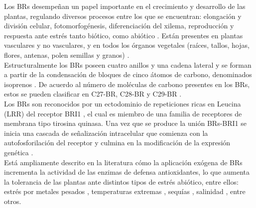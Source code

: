 Los BRs desempe\~nan un papel importante en el crecimiento y desarrollo de las plantas, regulando diversos procesos entre los que se encuentran: elongaci\'on y divisi\'on celular, fotomorfog\'enesis, diferenciaci\'on del xilema, reproducci\'on y respuesta ante estr\'es tanto bi\'otico, como abi\'otico \citep{nolan2020brassinosteroids}. Est\'an presentes en plantas vasculares y no vasculares, y en todos los \'organos vegetales (ra\'ices, tallos, hojas, flores, antenas, polen semillas y granos) \citep{bajguz2003chemical, zullo2019brassinosteroids}.\\

Estructuralmente los BRs poseen cuatro anillos y una cadena lateral y se forman a partir de la condensación de bloques de cinco átomos de carbono, denominados isoprenos \citep{bishop2001plants}. De acuerdo al n\'umero de mol\'eculas de carbono presentes en los BRs, estos se pueden clasificar en C27-BR, C28-BR y C29-BR \citep{bajguz2020comprehensive}. \\

Los BRs son reconocidos por un ectodominio de repeticiones ricas en Leucina (LRR) del receptor BRI1 \citep{clouse2015history}, el cual es miembro de una familia de receptores de membrana tipo tirosina quinasa. Una vez que se produce la uni\'on BRs-BRI1 se inicia una cascada de se\~{n}alizaci\'on intracelular que comienza con la autofosforilaci\'on del receptor y culmina en la modificaci\'on de la expresi\'on gen\'etica \citep{karlova2006advances}.\\

Est\'a ampliamente descrito en la literatura c\'omo la aplicaci\'on ex\'ogena de BRs incrementa la actividad de las enzimas de defensa antioxidantes, lo que aumenta la tolerancia de las plantas ante distintos tipos de estr\'es abi\'otico, entre ellos: estr\'es por metales pesados \citep{arora2012effect, yusuf2014brassinosteroid, he2016epibrassinolide, santos2018brassinosteroids,  dalyan2018effect}, temperaturas extremas \citep{hayat2010effect, mazorra2011heat, fariduddin201128}, sequ\'ias \citep{anjum2011brassinolide, lima2017brassinosteroids}, salinidad \citep{el2012brassinolide, ding2012amelioration}, entre otros.\\

